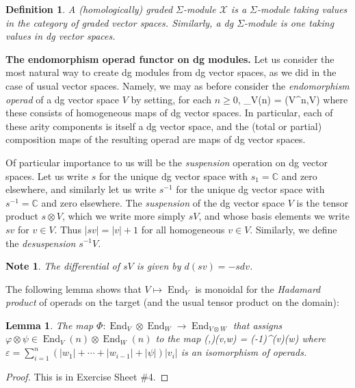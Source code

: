 \documentclass[fleqn,a4paper, twoside]{article}
\makeatletter
\newcommand{\0}{\langle 0\rangle}
\newcommand{\XX}{\mathcal{X}}
\newcommand{\End}{\operatorname{End}}
\let\[\@undefined
\DeclareRobustCommand{\[}{\begin{equation}}%
\let\]\@undefined
\DeclareRobustCommand{\]}{\end{equation}}%
\theoremstyle{mytheorem}
\newtheorem{lemma}[theorem]{Lemma}
\theoremstyle{introthm}
\theoremstyle{mydefinition}
\newtheorem{definition}[theorem]{Definition}
\newtheorem{note}[theorem]{Note}
\theoremstyle{mydefinition2}
\theoremstyle{plain} %
\newcommand{\?}{\,?\,}
\theoremstyle{mytheorem}
\theoremstyle{plain} %
\makeatother
\begin{document}
\begin{definition}
A (homologically) graded $\Sigma$-module $\XX$
is a $\Sigma$-module taking values in the category
of graded vector spaces. Similarly, a dg $\Sigma$-module
is one taking values in dg vector spaces.
\end{definition}

\textbf{The endomorphism operad functor on dg modules.}
Let us consider the most natural way to create dg modules
from dg vector spaces, as we did in the case of usual
vector spaces. Namely, we may as before consider the
\emph{endomorphism operad} of a dg vector space $V$
by setting, for each $n\geqslant 0$,
\[ \End_V(n) = \hom(V^{\otimes n},V) \]
where these consists of homogeneous maps of dg vector
spaces. In particular, each of these arity components is 
itself a dg vector space, and the (total or partial)
composition maps
of the resulting operad are maps of dg vector spaces.

Of particular importance to us will be the \emph{suspension}
operation on dg vector spaces. Let us write $s$ for the
unique dg vector space with $s_1 = \mathbb C$ and zero
elsewhere, and similarly let us write $s^{-1}$ for the
unique dg vector space with $s^{-1} = \mathbb{C}$
and zero elsewhere. The \emph{suspension} of the dg vector
space $V$ is the tensor product $s\otimes V$, which
we write more simply $sV$, and whose basis elements we
write $sv$ for $v\in V$. Thus $|sv| = |v|+1$ for all 
homogeneous $v\in V$. Similarly, we define the
\emph{desuspension} $s^{-1}V$.

\begin{note}
The differential of $sV$ is given by $d(sv) = -s dv$.
\end{note}
 
The following lemma shows that $V\mapsto \End_V$ is 
monoidal for the \emph{Hadamard product} of operads on the
target (and the usual tensor product on the domain): 
 \begin{lemma}
The map $\Phi : \End_V\otimes \End_W\longrightarrow \End_{V\otimes W}$
that assigns $\varphi \otimes \psi \in \End_V(n)\otimes \End_W(n)$
to the map
\[ \Phi(\varphi,\psi)(v,w) = (-1)^\varepsilon \varphi(v)\otimes\psi(w)\]
where $\varepsilon = \sum_{i=1}^n (|w_1| +\cdots + |w_{i-1}|+|\psi|)|v_i|$
is an isomorphism of operads.
 \end{lemma}
 
 \begin{proof}
 This is in Exercise Sheet \#4.
 \end{proof}
\end{document}
